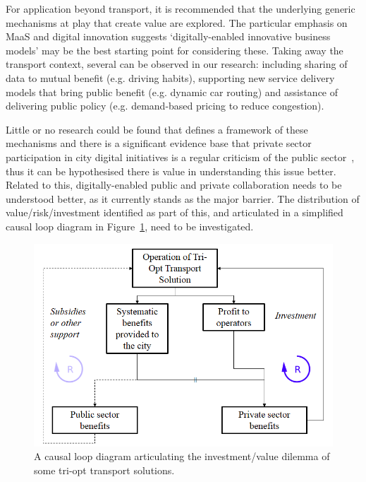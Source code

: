 \documentclass[journal]{IEEEtran}
\begin{document}
For application beyond transport, it is recommended that the
underlying generic mechanisms at play that create value are
explored. The particular emphasis on MaaS and digital innovation
suggests `digitally-enabled innovative business models' may be the
best starting point for considering these. Taking away the transport
context, several can be observed in our research: including sharing of
data to mutual benefit (e.g. driving habits), supporting new service
delivery models that bring public benefit (e.g. dynamic car routing)
and assistance of delivering public policy (e.g. demand-based pricing
to reduce congestion).

Little or no research could be found that defines a framework of these
mechanisms and there is a significant evidence base that private
sector participation in city digital initiatives is a regular
criticism of the public sector~\cite{ice:2015,martin:2016}, thus it
can be hypothesised there is value in understanding this issue
better. Related to this, digitally-enabled public and private
collaboration needs to be understood better, as it currently stands as
the major barrier. The distribution of value/risk/investment
identified as part of this, and articulated in a simplified causal
loop diagram in Figure~\ref{fig:causalloop}, need to be investigated.

\begin{figure}[!htb]
\centering
\includegraphics[width=\columnwidth]{images/causalloop.png}
\caption{A causal loop diagram articulating the investment/value
  dilemma of some tri-opt transport solutions.}
\label{fig:causalloop}
\end{figure}

\end{document}
